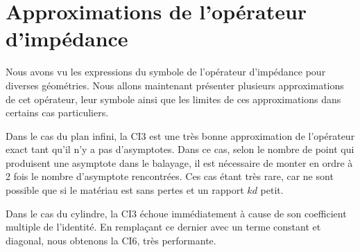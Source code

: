 \chapter{Approximations de l'opérateur d'impédance}
\minitoc
\newpage
{}
Nous avons vu les expressions du symbole de l'opérateur d'impédance pour diverses géométries. Nous allons maintenant présenter plusieurs approximations de cet opérateur, leur symbole ainsi que les limites de ces approximations dans certains cas particuliers.


%
Dans le cas du plan infini, la CI3 est une très bonne approximation de l'opérateur exact tant qu'il n'y a pas d'asymptotes. Dans ce cas, selon le nombre de point qui produisent une asymptote dans le balayage, il est nécessaire de monter en ordre à 2 fois le nombre d'asymptote rencontrées. Ces cas étant très rare, car ne sont possible que si le matériau est sans pertes et un rapport \(kd\) petit.

Dans le cas du cylindre, la CI3 échoue immédiatement à cause de son coefficient multiple de l'identité. En remplaçant ce dernier avec un terme constant et diagonal, nous obtenons la CI6, très performante. 